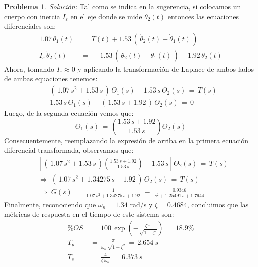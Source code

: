 \documentclass[ a4paper, twoside, 11pt]{article}
\renewcommand{\epsilon}{\varepsilon}
\theoremstyle{definition}
\newtheorem{problem}[definition]{Problema}
\begin{document}
\begin{problem}
\emph{Soluci\'on:} 
Tal como se indica en la sugerencia, si colocamos un cuerpo con inercia $I_\epsilon$ en el eje donde se mide $\theta_2(t)$ entonces las ecuaciones diferenciales son: 
\begin{align*}
1.07 \, \ddot{\theta}_1(t) \, 
& = \, T(t) + 1.53 \, ( \, \dot{\theta}_2(t) - \dot{\theta}_1(t) \, ) \\
I_{\epsilon} \, \ddot{\theta}_2(t) \, 
& = \, -1.53 \, ( \, \dot{\theta}_2(t) - \dot{\theta}_1(t) \, ) - 1.92 \, \theta_2(t)
\end{align*}
Ahora, tomando $I_{\epsilon} \approx 0$ y aplicando la transformaci\'on de Laplace de ambos lados de ambas equaciones tenemos: 
\begin{align*}
& ( \, 1.07 \, s^2 + 1.53 \, s \, ) \, \Theta_1(s) - 1.53 \, s \, \Theta_2(s) \, = \, T(s) \\
& 1.53 \, s \, \Theta_1(s) - ( \, 1.53 \, s + 1.92 \, ) \, \Theta_2(s) \, = \, 0
\end{align*}
Luego, de la segunda ecuaci\'on vemos que: 
\[
\Theta_1(s) \, = \, \left( \frac{ 1.53 \, s + 1.92 }{ 1.53 \, s } \right) \Theta_2(s)
\]
Consecuentemente, reemplazando la expresi\'on de arriba en la primera ecuaci\'on diferencial transformada, observamos que: 
\begin{align*}
& \left[ ( \, 1.07 \, s^2 + 1.53 \, s \, ) \left( \frac{ 1.53 \, s + 1.92 }{ 1.53 \, s } \right) 
- 1.53 \, s \right] \Theta_2(s) \, = \, T(s) \\[1ex]
& \Longrightarrow \; ( \, 1.07 \, s^2 + 1.34275 \, s + 1.92 \, ) \, \Theta_2(s) \, = \, T(s) \\[1ex]
& \Longrightarrow \; G(s) \; = \; 
\frac{1}{ 1.07 \, s^2 + 1.34275 \, s + 1.92 } \; \equiv \; \frac{ 0.9346 }{ s^2 + 1.25491 \, s + 1.7944 }
\end{align*}
Finalmente, reconociendo que $\omega_n = 1.34$ rad/s y $\zeta = 0.4684$, concluimos que las m\'etricas de respuesta en el tiempo de este sistema son: 
\begin{align*}
\% OS \, 
& = \, 100 \, \exp \left( -\frac{ \zeta \, \pi }{ \sqrt{1 - \zeta^2} } \right) 
\, = \, 18.9 \% \\[1ex]
T_p \, & = \, \frac{\pi}{ \omega_n \, \sqrt{1 - \zeta^2} } \, = \, 2.654 \: s \\[1ex]
T_s \, & = \, \frac{4}{ \zeta \, \omega_n } \, = \, 6.373 \: s
\end{align*}


\end{problem}
\vspace{\baselineskip}
\end{document}
